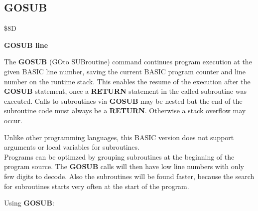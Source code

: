 
\newpage
\subsection{GOSUB}
\begin{description}[leftmargin=3cm,style=nextline]
\item [Token:] \$8D
\item [Format:] {\bf GOSUB line}
\item [Usage:] The {\bf GOSUB} (GOto SUBroutine)
               command continues program
               execution at the given BASIC line number,
               saving the current BASIC program counter
               and line number on the runtime stack.
               This enables the resume of the execution after
               the {\bf GOSUB} statement, once a {\bf RETURN}
               statement in the called subroutine was executed.
               Calls to subroutines via {\bf GOSUB} may be nested
               but the end of the subroutine code must always
               be a {\bf RETURN}. Otherwise a stack overflow
               may occur.

\item [Remarks:] Unlike other programming languages, this BASIC
               version does not support arguments or local
               variables for subroutines. \\
               Programs can be optimzed by grouping subroutines
               at the beginning of the program source. The
               {\bf GOSUB} calls will then have low line numbers
               with only few digits to decode. Also the subroutines
               will be found faster, because the search for subroutines
               starts very often at the start of the program.
\item [Example:] Using {\bf GOSUB}:
\end{description}



